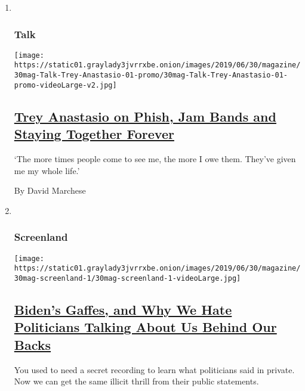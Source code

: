 \begin{enumerate}
\def\labelenumi{\arabic{enumi}.}
\item ~
  \hypertarget{talk}{%
  \subsubsection{Talk}\label{talk}}

  \texttt{[image: https://static01.graylady3jvrrxbe.onion/images/2019/06/30/magazine/30mag-Talk-Trey-Anastasio-01-promo/30mag-Talk-Trey-Anastasio-01-promo-videoLarge-v2.jpg]}

  \hypertarget{trey-anastasio-on-phish-jam-bands-and-staying-together-forever}{%
  \subsection{\texorpdfstring{\href{/interactive/2019/06/24/magazine/trey-anastasio-phish.html}{Trey
  Anastasio on Phish, Jam Bands and Staying Together
  Forever}}{Trey Anastasio on Phish, Jam Bands and Staying Together Forever}}\label{trey-anastasio-on-phish-jam-bands-and-staying-together-forever}}

  `The more times people come to see me, the more I owe them. They've
  given me my whole life.'

  By David Marchese
\item ~
  \hypertarget{screenland}{%
  \subsubsection{Screenland}\label{screenland}}

  \texttt{[image: https://static01.graylady3jvrrxbe.onion/images/2019/06/30/magazine/30mag-screenland-1/30mag-screenland-1-videoLarge.jpg]}

  \hypertarget{bidens-gaffes-and-why-we-hate-politicians-talking-about-us-behind-our-backs}{%
  \subsection{\texorpdfstring{\href{/2019/06/26/magazine/bidens-gaffes-and-why-we-hate-politicians-talking-about-us-behind-our-backs.html}{Biden's
  Gaffes, and Why We Hate Politicians Talking About Us Behind Our
  Backs}}{Biden's Gaffes, and Why We Hate Politicians Talking About Us Behind Our Backs}}\label{bidens-gaffes-and-why-we-hate-politicians-talking-about-us-behind-our-backs}}

  You used to need a secret recording to learn what politicians said in
  private. Now we can get the same illicit thrill from their public
  statements.


\end{enumerate}
